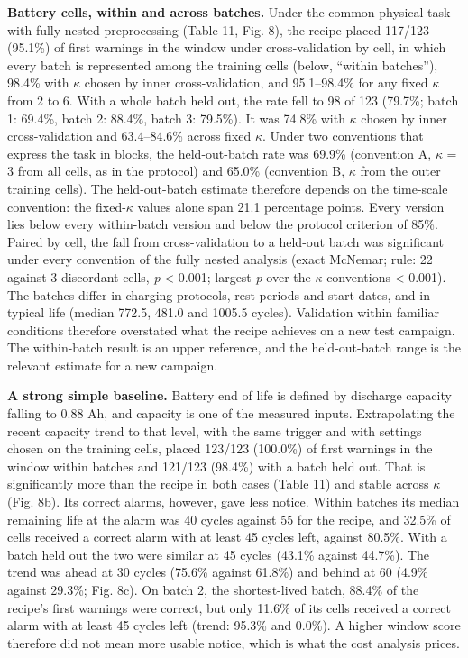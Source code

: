\documentclass[a4paper,fleqn,doubleblind]{cas-dc}
\begin{document}
\textbf{Battery cells, within and across batches.} Under the common physical task with fully nested preprocessing (Table 11, Fig. 8), the recipe placed 117/123 (95.1\%) of first warnings in the window under cross-validation by cell, in which every batch is represented among the training cells (below, ``within batches''), 98.4\% with $\kappa$ chosen by inner cross-validation, and 95.1--98.4\% for any fixed $\kappa$ from 2 to 6. With a whole batch held out, the rate fell to 98 of 123 (79.7\%; batch 1: 69.4\%, batch 2: 88.4\%, batch 3: 79.5\%). It was 74.8\% with $\kappa$ chosen by inner cross-validation and 63.4--84.6\% across fixed $\kappa$. Under two conventions that express the task in blocks, the held-out-batch rate was 69.9\% (convention A, $\kappa$ = 3 from all cells, as in the protocol) and 65.0\% (convention B, $\kappa$ from the outer training cells). The held-out-batch estimate therefore depends on the time-scale convention: the fixed-$\kappa$ values alone span 21.1 percentage points. Every version lies below every within-batch version and below the protocol criterion of 85\%. Paired by cell, the fall from cross-validation to a held-out batch was significant under every convention of the fully nested analysis (exact McNemar; rule: 22 against 3 discordant cells, \textit{p} < 0.001; largest \textit{p} over the $\kappa$ conventions < 0.001). The batches differ in charging protocols, rest periods and start dates, and in typical life (median 772.5, 481.0 and 1005.5 cycles). Validation within familiar conditions therefore overstated what the recipe achieves on a new test campaign. The within-batch result is an upper reference, and the held-out-batch range is the relevant estimate for a new campaign.

\textbf{A strong simple baseline.} Battery end of life is defined by discharge capacity falling to 0.88 Ah, and capacity is one of the measured inputs. Extrapolating the recent capacity trend to that level, with the same trigger and with settings chosen on the training cells, placed 123/123 (100.0\%) of first warnings in the window within batches and 121/123 (98.4\%) with a batch held out. That is significantly more than the recipe in both cases (Table 11) and stable across $\kappa$ (Fig. 8b). Its correct alarms, however, gave less notice. Within batches its median remaining life at the alarm was 40 cycles against 55 for the recipe, and 32.5\% of cells received a correct alarm with at least 45 cycles left, against 80.5\%. With a batch held out the two were similar at 45 cycles (43.1\% against 44.7\%). The trend was ahead at 30 cycles (75.6\% against 61.8\%) and behind at 60 (4.9\% against 29.3\%; Fig. 8c). On batch 2, the shortest-lived batch, 88.4\% of the recipe's first warnings were correct, but only 11.6\% of its cells received a correct alarm with at least 45 cycles left (trend: 95.3\% and 0.0\%). A higher window score therefore did not mean more usable notice, which is what the cost analysis prices.
\end{document}
